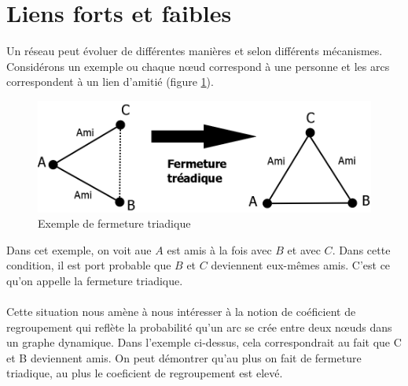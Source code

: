\section{Liens forts et faibles}
Un réseau peut évoluer de différentes manières et selon différents mécanismes.
Considérons un exemple ou chaque n\oe ud correspond à une personne et les arcs correspondent à un lien d'amitié (figure \ref{fermeture_triadique}).
	\begin{figure}
	\center
	\includegraphics[scale=0.5]{images/18_fermeture_triadique.png}
	\caption{\label{fermeture_triadique} Exemple de fermeture triadique}
	\end{figure}
Dans cet exemple, on voit aue $A$ est amis à la fois avec $B$ et avec $C$. Dans cette condition, il est port probable que $B$ et $C$ deviennent eux-mêmes amis. C'est ce qu'on appelle la fermeture triadique.\\
\\
Cette situation nous amène à nous intéresser à la notion de coéficient de regroupement qui reflète la probabilité qu'un arc se crée entre deux n\oe uds dans un graphe dynamique. 
Dans l'exemple ci-dessus, cela correspondrait au fait que C et B deviennent amis. On peut démontrer qu'au plus on fait de fermeture triadique, au plus le coeficient de regroupement est elevé.

